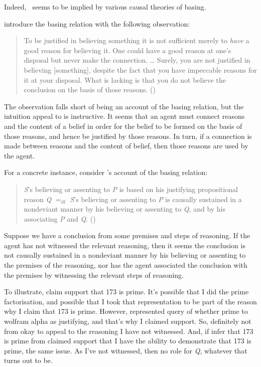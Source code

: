 \begin{note}
  Indeed,~\ESU{} seems to be implied by various causal theories of basing.

  \citeauthor{Pollock:1999tm} introduce the basing relation with the following observation:
  \begin{quote}
    To be justified in believing something it is not sufficient merely to \emph{have} a good reason for believing it.
    One could have a good reason at one's disposal but never make the connection.
    \dots
    Surely, you are not justified in believing [something], despite the fact that you have impeccable reasons for it at your disposal.
    What is lacking is that you do not believe the conclusion on the basis of those reasons.\nolinebreak
    \mbox{}\hfill\mbox{(\cite[35]{Pollock:1999tm})}
  \end{quote}
  The observation falls short of being an account of the basing relation, but the intuition \citeauthor{Pollock:1999tm} appeal to is instructive.
  It seems that an agent must connect reasons and the content of a belief in order for the belief to be formed on the basis of those reasons, and hence be justified by those reasons.
  In turn, if a connection is made between reasons and the content of belief, then those reasons are used by the agent.

  For a concrete instance, consider \citeauthor{Moser:1989tv}'s account of the basing relation:
  \begin{quote}
    \emph{S}'s believing or assenting to \emph{P} is based on his justifying propositional reason \emph{Q} \(=_{\text{df}}\) \emph{S}'s believing or assenting to \emph{P} is causally sustained in a nondeviant manner by his believing or assenting to \emph{Q}, and by his associating \emph{P} and \emph{Q}.\nolinebreak
    \mbox{}\hfill\mbox{(\cite*[157]{Moser:1989tv})}
  \end{quote}

  Suppose we have a conclusion from some premises and steps of reasoning.
  If the agent has not witnessed the relevant reasoning, then it seems the conclusion is not causally sustained in a nondeviant manner by his believing or assenting to the premises of the reasoning, nor has the agent associated the conclusion with the premises by witnessing the relevant steps of reasoning.

  To illustrate, claim support that 173 is prime.
  It's possible that I did the prime factorisation, and possible that I took that representation to be part of the reason why I claim that 173 is prime.
  However, represented query of whether prime to wolfram alpha as justifying, and that's why I claimed support.
  So, definitely not from okay to appeal to the reasoning I have not witnessed.
  And, if infer that 173 is prime from claimed support that I have the ability to demonstrate that 173 is prime, the same issue.
  As I've not witnessed, then no role for \emph{Q}, whatever that turns out to be.


\end{note}
